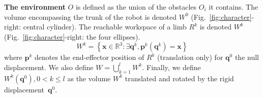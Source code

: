 \medskip
\textbf{The environment} $O$ is defined as the union of the obstacles $O_i$ it contains.
The volume encompassing the trunk of the robot is denoted $W^0$ (Fig.~\ref{fig:character}-right: central cylinder). The reachable workspace of a limb $R^k$ is denoted $W^k$ (Fig.~\ref{fig:character}-right: the four ellipses). 
\begin{equation}
  W^k = \left\{ {\mathbf{x} \in \mathbb{R}^3: \exists \mathbf{q}^k, \mathbf{p}^k(\mathbf{q}^k) = \mathbf{x} } \right\}
\end{equation}
where $\mathbf{p}^k$ denotes the end-effector position of $R^k$ (translation only) for $\mathbf{q}^0$ the null displacement. We also define $W = \bigcup_{k=1}^{l}W^k$.
%
Finally, we define $W^k(\mathbf{q}^{0}), 0 < k \leq l$ as the volume $W^k$ translated and rotated by the rigid displacement~$\mathbf{q}^{0}$.

